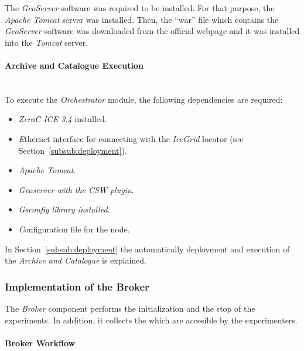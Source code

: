 The \emph{GeoServer} software was required to be installed. For that purpose, the
\emph{Apache Tomcat} server was installed. Then, the ``war''
file which contains the \emph{GeoServer} software was downloaded from the
official webpage and it was installed into the \emph{Tomcat} server.

\paragraph{Archive and Catalogue Execution}~\\

To execute the \emph{Orchestrator} module, the following dependencies
are required:
\begin{itemize}
\item \emph{ZeroC ICE 3.4} installed.
\item \emph Ethernet interface for connecting with the \emph{IceGrid} locator (see
  Section~\ref{subsub:deployment}).
\item \emph{Apache Tomcat}.
\item \emph{Geoserver with the \ac{CSW} plugin}.
\item \emph{Gsconfig library installed}.
\item \emph Configuration file for the node.
\end{itemize}
 In Section~\ref{subsub:deployment} the
  automatically deployment and execution of the \emph{Archive and Catalogue} is explained. 

\subsubsection{Implementation of the Broker}

The \emph{Broker} component performs the initialization and the stop of the
experiments. In addition, it collects the which are accesible by the experimenters.

\paragraph{Broker Workflow}~\\

